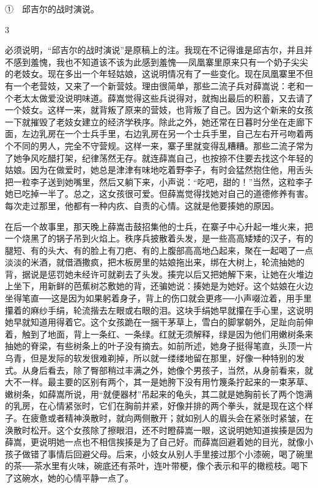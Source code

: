 ①　邱吉尔的战时演说。 

3 

必须说明，“邱吉尔的战时演说”是原稿上的注。我现在不记得谁是邱吉尔，并且并不感到羞愧，我也不知道该不该为此感到羞愧──凤凰寨里原来只有一个奶子尖尖的老妓女。现在多出一个年轻姑娘，这说明情况有了一些变化。现在凤凰寨里不但有一个老营妓，又来了一个新营妓。理由很简单，那些二流子兵对薛嵩说：老和一个老太太做爱没说明味道。薛嵩觉得这些兵说得对，就掏出最后的积蓄，又去请了一个妓女。这样一来，就背叛了原来的营妓，也背叛了自己。因为这个新来的女孩一下就摧毁了老妓女建立的经济学秩序。除此之外，她还常在日暮时分坐在走廊下面，左边乳房在一个士兵手里，右边乳房在另一个士兵手里，自己左右开弓吻着两个不同的男人，完全不守营规。这样一来，寨子里就变得乱糟糟。那些二流子常为了她争风吃醋打架，纪律荡然无存。就连薛嵩自己，也按捺不住要去找这个年轻的姑娘。因为在做爱时，她总是津津有味地吃着野李子，有时会猛然抱住他，用舌头把一粒李子送到她嘴里，然后又躺下来，小声说：“吃吧，甜的！”当然，这粒李子她已吃掉一半了。总之，这女孩很可爱。但薛嵩觉得找她对自己的道德修养有害。每次走过那里，他都有一种内疚、自责的心情。这就是他要揍她的原因。 

在后一个故事里，那天晚上薛嵩击鼓招集他的士兵，在寨子中心升起一堆火来，把一个烧黑了的锅子吊到火焰上。秩序兵披散着头发，是一些高高矮矮的汉子，有的腿短、有的头大、有的脸上有刀疤、有的上腹部高高地凸起来，聚在一起喝了一点淡淡的米酒，就借酒撒疯，把木板房里的姑娘拖出来，绑在大树上，轮流抽她的背，据说是惩罚她未经许可就剃去了头发。揍完以后又把她解下来，让她在火堆边上坐下，用新鲜的芭蕉树芯敷她的背，还骗她说：揍她是为她好。这个姑娘在火边坐得笔直──这是因为如果躬着身子，背上的伤口就会更疼──小声啜泣着，用手里攥着的麻纱手绢，轮流揩去左眼或右眼的泪。这块手绢她早就攥在手心里，这说明她早就知道用得着它。这个女孩跪在一捆干茅草上，雪白的脚掌朝外，足趾向前伸着，触到了地面，背上一条红、一条绿。红就无须解释，绿是因为他们用嫩树条来抽她的脊梁，有些树条上的叶子没有摘去。如前所述，她身子挺得笔直，头顶一片乌青，但是发际的软发很难剃掉，所以就一缕缕地留在那里，好像一种特别的发式。从身后看去，除了臀部稍过丰满之外，她像个男孩子，当然，从身前看来，就大不一样。最主要的区别有两个，其一是她胯下没有用竹篾条拧起来的一束茅草、嫩树条，如薛嵩所说，用“就便器材”吊起来的龟头，其二就是她胸前长了两个饱满的乳房，在心情紧张时，它们在胸前并紧，好像并排的两个拳头，就是现在这个样子。在疲惫或者精神涣散时，就向两侧散开；就如别人的眉头会在紧张时紧皱，在涣散时松开。这个女孩除了擦眼泪，还不时瞪薛嵩一眼，这说明她知道挨揍是因为薛嵩，更说明她一点也不相信挨揍是为了自己好。而薛嵩回避着她的目光，就像小孩子做错了事情后回避父母。后来，小妓女从别人手里接过那个小漆碗，喝了碗里的茶──茶水里有火味，碗底还有茶叶，连叶带梗，像个表示和平的橄榄枝。喝下了这碗水，她的心情平静一点了。 

